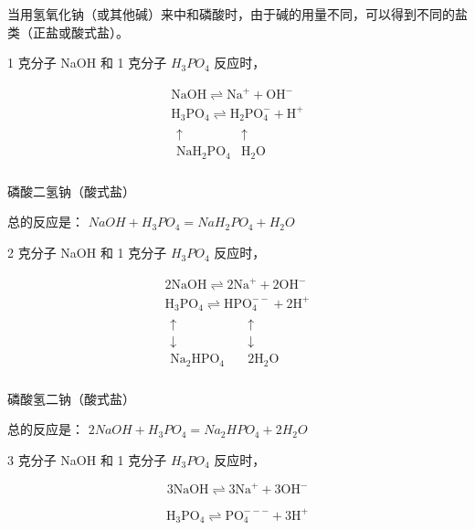 当用氢氧化钠（或其他碱）来中和磷酸时，由于碱的用量不同，可以得到不同的盐类（正盐或酸式盐）。

1 克分子 NaOH 和 1 克分子 \(H_{3}PO_{4}\) 反应时，

\[
\begin{array}{l} \mathrm{NaOH} \rightleftharpoons \mathrm{Na} ^ {+} + \mathrm{OH} ^ {-} \\ \mathrm{H} _ {3} \mathrm{PO} _ {4} \rightleftharpoons \mathrm{H} _ {2} \mathrm{PO} _ {4} ^ {-} + \mathrm{H} ^ {+} \\ \begin{array}{cc} \uparrow & \uparrow \\ \mathrm{NaH} _ {2} \mathrm{PO} _ {4} & \mathrm{H} _ {2} \mathrm{O} \end{array} \\ \end{array}
\]

磷酸二氢钠（酸式盐）

总的反应是： \(NaOH+H_{3}PO_{4}=NaH_{2}PO_{4}+H_{2}O\)

2 克分子 NaOH 和 1 克分子 \(H_{3}PO_{4}\) 反应时，

\[
\begin{array}{l} 2 \mathrm{NaOH} \rightleftharpoons 2 \mathrm{Na} ^ {+} + 2 \mathrm{OH} ^ {-} \\ \mathrm{H} _ {3} \mathrm{PO} _ {4} \rightleftharpoons \mathrm{HPO} _ {4} ^ {- -} + 2 \mathrm{H} ^ {+} \\ \begin{array}{c} \uparrow \\ \downarrow \\ \mathrm{Na} _ {2} \mathrm{HPO} _ {4} \end{array} \quad \begin{array}{c} \uparrow \\ \downarrow \\ 2 \mathrm{H} _ {2} \mathrm{O} \end{array} \\ \end{array}
\]

磷酸氢二钠（酸式盐）

总的反应是： \(2NaOH+H_{3}PO_{4}=Na_{2}HPO_{4}+2H_{2}O\)

3 克分子 NaOH 和 1 克分子 \(H_{3}PO_{4}\) 反应时，

\[
3 \mathrm{NaOH} \rightleftharpoons 3 \mathrm{Na} ^ {+} + 3 \mathrm{OH} ^ {-}
\]

\[
\mathrm{H} _ {3} \mathrm{PO} _ {4} \rightleftharpoons \mathrm{PO} _ {4} ^ {- - -} + 3 \mathrm{H} ^ {+}
\]

